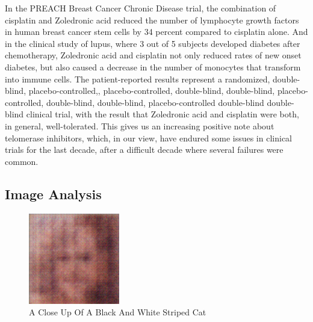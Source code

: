 \documentclass{article}%
\begin{document}
In the PREACH Breast Cancer Chronic Disease trial, the combination of cisplatin and Zoledronic acid reduced the number of lymphocyte growth factors in human breast cancer stem cells by 34 percent compared to cisplatin alone. And in the clinical study of lupus, where 3 out of 5 subjects developed diabetes after chemotherapy, Zoledronic acid and cisplatin not only reduced rates of new onset diabetes, but also caused a decrease in the number of monocytes that transform into immune cells.\newline%
The patient{-}reported results represent a randomized, double{-}blind, placebo{-}controlled,, placebo{-}controlled, double{-}blind, double{-}blind, placebo{-}controlled, double{-}blind, double{-}blind, placebo{-}controlled double{-}blind double{-}blind clinical trial, with the result that Zoledronic acid and cisplatin were both, in general, well{-}tolerated. This gives us an increasing positive note about telomerase inhibitors, which, in our view, have endured some issues in clinical trials for the last decade, after a difficult decade where several failures were common.

%
\subsection{Image Analysis}%
\label{subsec:ImageAnalysis}%


\begin{figure}[h!]%
\centering%
\includegraphics[width=150px]{500_fake_images/samples_5_28.png}%
\caption{A Close Up Of A Black And White Striped Cat}%
\end{figure}

%
\end{document}
